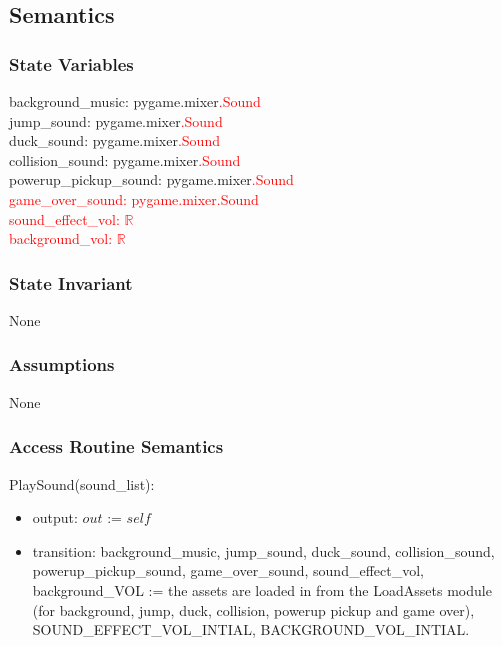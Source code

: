 \documentclass[12pt]{article}
\begin{document}
\subsection* {Semantics}

\subsubsection* {State Variables}

background\_music: pygame.mixer\textcolor{red}{.Sound}\\
jump\_sound: pygame.mixer\textcolor{red}{.Sound}\\
duck\_sound: pygame.mixer\textcolor{red}{.Sound}\\
collision\_sound: pygame.mixer\textcolor{red}{.Sound}\\
powerup\_pickup\_sound: pygame.mixer\textcolor{red}{.Sound}\\
\textcolor{red}{game\_over\_sound: pygame.mixer.Sound}\\
\textcolor{red}{sound\_effect\_vol: $\mathbb{R}$}\\
\textcolor{red}{background\_vol: $\mathbb{R}$}
\subsubsection* {State Invariant}

None

\subsubsection* {Assumptions}

None

\subsubsection* {Access Routine Semantics}

PlaySound(sound\_list):
\begin{itemize}
    \item output: $out$ := $self$
    \item transition: background\_music, jump\_sound, duck\_sound, collision\_sound, powerup\_pickup\_sound, game\_over\_sound, sound\_effect\_vol, background\_VOL := the assets are loaded in from the LoadAssets module (for background, jump, duck, collision, powerup pickup and game over), SOUND\_EFFECT\_VOL\_INTIAL, BACKGROUND\_VOL\_INTIAL.
\end{itemize}
\end{document}
